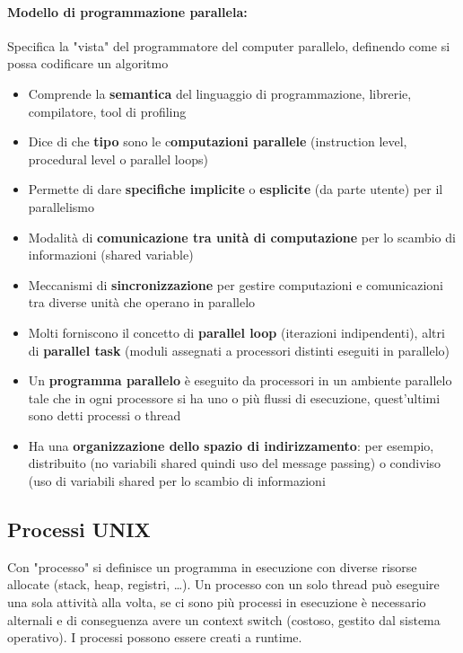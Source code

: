 \paragraph{Modello di programmazione parallela:} Specifica la "vista" del programmatore del computer parallelo, definendo come si possa codificare un algoritmo
\begin{itemize}
	\item Comprende la \textbf{semantica} del linguaggio di programmazione, librerie, compilatore, tool di profiling
	\item Dice di che \textbf{tipo} sono le c\textbf{omputazioni parallele} (instruction level, procedural level o parallel loops)
	\item Permette di dare \textbf{specifiche implicite} o \textbf{esplicite} (da parte utente) per il parallelismo
	\item Modalità di \textbf{comunicazione tra unità di computazione} per lo scambio di informazioni (shared variable)
	\item Meccanismi di \textbf{sincronizzazione} per gestire computazioni e comunicazioni tra diverse unità che operano in parallelo
	\item Molti forniscono il concetto di \textbf{parallel loop} (iterazioni indipendenti), altri di \textbf{parallel task} (moduli assegnati a processori distinti eseguiti in parallelo)
	\item Un \textbf{programma parallelo} è eseguito da processori in un ambiente parallelo tale che in ogni processore si ha uno o più flussi di esecuzione, quest'ultimi sono detti processi o thread
	\item Ha una \textbf{organizzazione dello spazio di indirizzamento}: per esempio, distribuito (no variabili shared quindi uso del message passing) o condiviso (uso di variabili shared per lo scambio di informazioni
\end{itemize}


\subsection{Processi UNIX}
Con "processo" si definisce un programma in esecuzione con diverse risorse allocate (stack, heap, registri, \dots). Un processo con un solo thread può eseguire una sola attività alla volta, se ci sono più processi in esecuzione è necessario alternali e di conseguenza avere un context switch (costoso, gestito dal sistema operativo). I processi possono essere creati a runtime.\\

